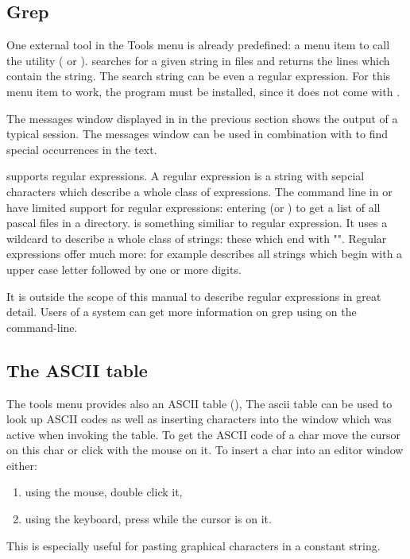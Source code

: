 \subsection{Grep}
\label{se:grep}
One external tool in the Tools menu is already predefined: a
menu item to call the  utility ( or
).  searches for a given string in files and
returns the lines which contain the string. The search string can
be even a regular expression. For this menu item to work, the
 program must be installed, since it does not come with \fpc.

The messages window displayed in  in the previous 
section shows the output of a typical  session. The messages
window can be used in combination with  to find special
occurrences in the text.

 supports regular expressions. A regular expression is a 
string with sepcial characters which describe a whole class of 
expressions. The command line in \dos or \linux have limited 
support for regular expressions: entering  
(or ) to get a list of all pascal files in a
directory.  is something similiar to regular expression. 
It uses a wildcard to describe a whole class of strings: these which 
end with "". 
Regular expressions offer much more: for example \var{[A-Z][0-9]+} 
describes all strings which begin with a upper case letter followed by
one or more digits.

It is outside the scope of this manual to describe regular expressions
in great detail. Users of a \linux system can get more information on grep
using  on the command-line.
%
%
\subsection{The ASCII table}
\label{se:asciitable}
The tools menu provides also an ASCII table (),
The ascii table can be used to look up ASCII codes as well as
inserting characters into the window which was active when invoking the
table. To get the ASCII code of a char move the cursor on this char 
or click with the mouse on it. To insert a
char into an editor window either:
\begin{enumerate}
\item using the mouse, double click it,
\item using the keyboard,  press  while the cursor is on it.
\end{enumerate}
This is especially useful for pasting graphical characters in a constant
string.

